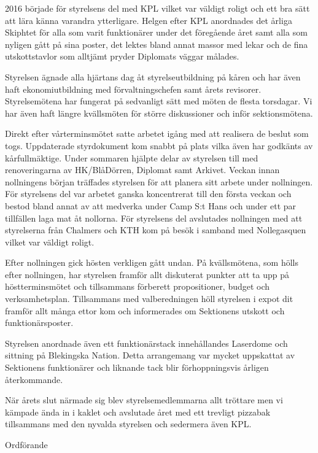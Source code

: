 \documentclass[../_main/handlingar.tex]{subfiles}
\begin{document}
2016 började för styrelsens del med KPL vilket var väldigt roligt och ett bra sätt att lära känna varandra ytterligare. Helgen efter KPL anordnades det årliga Skiphtet för alla som varit funktionärer under det föregående året samt alla som nyligen gått på sina poster, det lektes bland annat massor med lekar och de fina utskottstavlor som alltjämt pryder Diplomats väggar målades.

Styrelsen ägnade alla hjärtans dag åt styrelseutbildning på kåren och har även haft ekonomiutbildning med förvaltningschefen samt årets revisorer. Styrelsemötena har fungerat på sedvanligt sätt med möten de flesta torsdagar. Vi har även haft längre kvällsmöten för större diskussioner och inför sektionsmötena.

Direkt efter vårterminsmötet satte arbetet igång med att realisera de beslut som togs. Uppdaterade styrdokument kom snabbt på plats vilka även har godkänts av kårfullmäktige. Under sommaren hjälpte delar av styrelsen till med renoveringarna av HK/BlåDörren, Diplomat samt Arkivet. Veckan innan nollningens början träffades styrelsen för att planera sitt arbete under nollningen. För styrelsens del var arbetet ganska koncentrerat till den första veckan och bestod bland annat av att medverka under Camp S:t Hans och under ett par tillfällen laga mat åt nollorna. För styrelsens del avslutades nollningen med att styrelserna från Chalmers och KTH kom på besök i samband med Nollegasquen vilket var väldigt roligt.

Efter nollningen gick hösten verkligen gått undan. På kvällsmötena, som hölls efter nollningen, har styrelsen framför allt diskuterat punkter att ta upp på höstterminsmötet och tillsammans förberett propositioner, budget och verksamhetsplan. Tillsammans med valberedningen höll styrelsen i expot dit framför allt många ettor kom och informerades om Sektionens utskott och funktionärsposter.

Styrelsen anordnade även ett funktionärstack innehållandes Laserdome och sittning på Blekingska Nation. Detta arrangemang var mycket uppskattat av Sektionens funktionärer och liknande tack blir förhoppningsvis årligen återkommande.

När årets slut närmade sig blev styrelsemedlemmarna allt tröttare men vi kämpade ända in i kaklet och avslutade året med ett trevligt pizzabak tillsammans med den nyvalda styrelsen och sedermera även KPL.
\begin{signatures}{1}
    \mvh
    \signature{Fredrik Peterson}{Ordförande}
\end{signatures}
\end{document}
